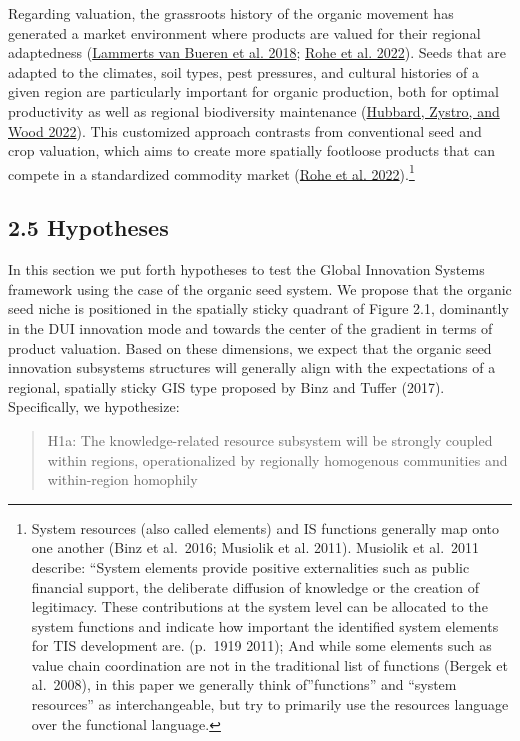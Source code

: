 \documentclass[twoside,12pt,final]{ucthesis-CA2012}
\begin{document}
\begin{ucmainmatter}
Regarding valuation, the grassroots history of the organic movement has
generated a market environment where products are valued for their
regional adaptedness (\protect\hyperlink{ref-Lammerts_van_Bueren_Struik_van_Eekeren_Nuijten_2018}{Lammerts van Bueren et al. 2018}; \protect\hyperlink{ref-Rohe_Oltmer_Wolter_Gmeiner_Tschersich_2022}{Rohe et al. 2022}).
Seeds that are adapted to the climates, soil types, pest pressures, and
cultural histories of a given region are particularly important for
organic production, both for optimal productivity as well as regional
biodiversity maintenance
(\protect\hyperlink{ref-Hubbard_Zystro_Wood_2022}{Hubbard, Zystro, and Wood 2022}).
This customized approach contrasts from conventional seed and crop
valuation, which aims to create more spatially footloose products that
can compete in a standardized commodity market
(\protect\hyperlink{ref-Rohe_Oltmer_Wolter_Gmeiner_Tschersich_2022}{Rohe et al. 2022}).\footnote{System resources (also called \textquotesingle elements\textquotesingle) and IS functions
  generally map onto one another (Binz et al.~2016; Musiolik et al.
  2011). Musiolik et al.~2011 describe: ``System elements provide
  positive externalities such as public financial support, the
  deliberate diffusion of knowledge or the creation of legitimacy.
  These contributions at the system level can be allocated to the
  system functions and indicate how important the identified system
  elements for TIS development are.\textquotesingle{} (p.~1919 2011); And while some
  elements such as \textquotesingle value chain coordination\textquotesingle{} are not in the
  traditional list of functions (Bergek et al.~2008), in this paper we
  generally think of''functions'' and ``system resources'' as
  interchangeable, but try to primarily use the \textquotesingle resources\textquotesingle{} language
  over the \textquotesingle functional\textquotesingle{} language.}

\hypertarget{hypotheses-1}{%
\subsection{2.5 Hypotheses}\label{hypotheses-1}}

In this section we put forth hypotheses to test the Global Innovation
Systems framework using the case of the organic seed system. We propose
that the organic seed niche is positioned in the \textquotesingle spatially sticky\textquotesingle{}
quadrant of Figure 2.1, dominantly in the DUI innovation mode and
towards the center of the gradient in terms of product valuation. Based
on these dimensions, we expect that the organic seed innovation
subsystems\textquotesingle{} structures will generally align with the expectations of a
regional, spatially sticky GIS type proposed by Binz and Tuffer (2017).
Specifically, we hypothesize:
\begin{quote}
H1a: The knowledge-related resource subsystem will be strongly coupled
within regions, operationalized by regionally homogenous communities
and within-region homophily


\end{quote}
\end{ucmainmatter}
\end{document}
